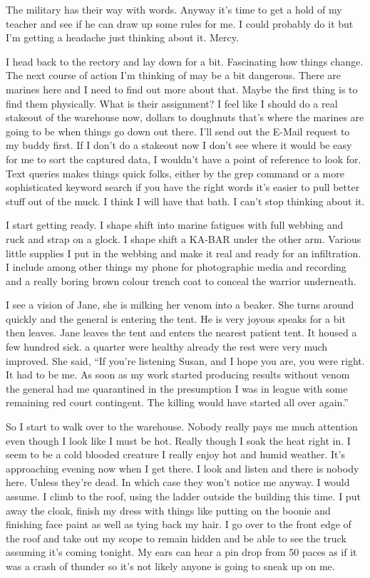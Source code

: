 The military has their way with words. Anyway it's time to get a hold of my teacher and see if he can draw up some rules for me. I could probably do it but I'm getting a headache just thinking about it. Mercy.

I head back to the rectory and lay down for a bit. Fascinating how things change. The next course of action I'm thinking of may be a bit dangerous. There are marines here and I need to find out more about that. Maybe the first thing is to find them physically. What is their assignment? I feel like I should do a real stakeout of the warehouse now, dollars to doughnuts that's where the marines are going to be when things go down out there. I'll send out the E-Mail request to my buddy first. If I don't do a stakeout now I don't see where it would be easy for me to sort the captured data, I wouldn't have a point of reference to look for. Text queries makes things quick folks, either by the grep command or a more sophisticated keyword search if you have the right words it's easier to pull better stuff out of the muck. I think I will have that bath. I can't stop thinking about it.

I start getting ready. I shape shift into marine fatigues with full webbing and ruck and strap on a glock. I shape shift a KA-BAR under the other arm. Various little supplies I put in the webbing and make it real and ready for an infiltration. I include among other things my phone for photographic media and recording and a really boring brown colour trench coat to conceal the warrior underneath.

I see a vision of Jane, she is milking her venom into a beaker. She turns around quickly and the general is entering the tent. He is very joyous speaks for a bit then leaves. Jane leaves the tent and enters the nearest patient tent. It housed a few hundred sick. a quarter were healthy already the rest were very much improved. She said, ``If you're listening Susan, and I hope you are, you were right. It had to be me. As soon as my work started producing results without venom the general had me quarantined in the presumption I was in league with some remaining red court contingent.  The killing would have started all over again.''

So I start to walk over to the warehouse. Nobody really pays me much attention even though I look like I must be hot. Really though I soak the heat right in. I seem to be a cold blooded creature I really enjoy hot and humid weather. It's approaching evening now when I get there. I look and listen and there is nobody here. Unless they're dead. In which case they won't notice me anyway. I would assume. I climb to the roof, using the ladder outside the building this time. I put away the cloak, finish my dress with things like putting on the boonie and finishing face paint as well as tying back my hair. I go over to the front edge of the roof and take out my scope to remain hidden and be able to see the truck assuming it's coming tonight. My ears can hear a pin drop from 50 paces as if it was a crash of thunder so it's not likely anyone is going to sneak up on me.

